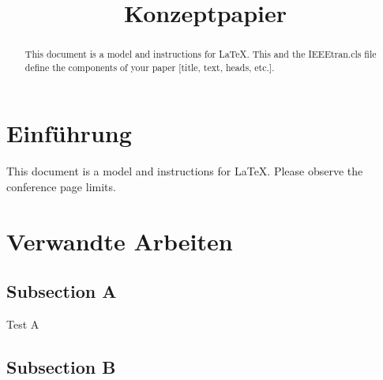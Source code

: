 \documentclass[conference]{IEEEtran}
\begin{document}
\title{Konzeptpapier}

\author{
	\and

	\and
	
	\and
	
	\and
	
	\and
	
}

\maketitle

\begin{abstract}
This document is a model and instructions for \LaTeX.
This and the IEEEtran.cls file define the components of your paper [title, text, heads, etc.].
\end{abstract}


\section{Einführung}

This document is a model and instructions for \LaTeX.
Please observe the conference page limits.




\section{Verwandte Arbeiten}

\subsection{Subsection A}

Test A

\subsection{Subsection B}
\end{document}
